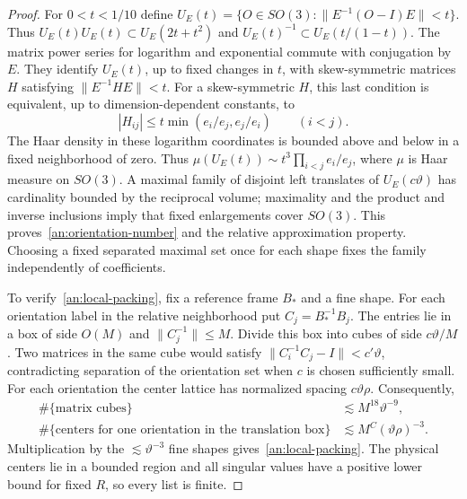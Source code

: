 \documentclass[11pt]{amsart}
\theoremstyle{definition}
\theoremstyle{remark}
\numberwithin{equation}{section}
\begin{document}
\begin{proof}
For $0<t<1/10$ define $U_E(t)=\{O\in SO(3):\|E^{-1}(O-I)E\|<t\}$. Thus $U_E(t)U_E(t)\subset U_E(2t+t^2)$ and $U_E(t)^{-1}\subset U_E(t/(1-t))$. The matrix power series for logarithm and exponential commute with conjugation by $E$. They identify $U_E(t)$, up to fixed changes in $t$, with skew-symmetric matrices $H$ satisfying $\|E^{-1}HE\|<t$. For a skew-symmetric $H$, this last condition is equivalent, up to dimension-dependent constants, to
\[
|H_{ij}|\le t\min(e_i/e_j,e_j/e_i)\qquad(i<j).
\]
The Haar density in these logarithm coordinates is bounded above and below in a fixed neighborhood of zero. Thus $\mu(U_E(t))\sim t^3\prod_{i<j}e_i/e_j$, where $\mu$ is Haar measure on $SO(3)$. A maximal family of disjoint left translates of $U_E(c\vartheta)$ has cardinality bounded by the reciprocal volume; maximality and the product and inverse inclusions imply that fixed enlargements cover $SO(3)$. This proves~\eqref{an:orientation-number} and the relative approximation property. Choosing a fixed separated maximal set once for each shape fixes the family independently of coefficients.

To verify~\eqref{an:local-packing}, fix a reference frame $B_*$ and a fine shape. For each orientation label in the relative neighborhood put $C_j=B_*^{-1}B_j$. The entries lie in a box of side $O(M)$ and $\|C_j^{-1}\|\le M$. Divide this box into cubes of side $c\vartheta/M$. Two matrices in the same cube would satisfy $\|C_i^{-1}C_j-I\|<c'\vartheta$, contradicting separation of the orientation set when $c$ is chosen sufficiently small. For each orientation the center lattice has normalized spacing $c\vartheta\rho$. Consequently,
\[
\begin{aligned}
\#\{\text{matrix cubes}\}&\lesssim M^{18}\vartheta^{-9},\\
\#\{\text{centers for one orientation in the translation box}\}&\lesssim M^C(\vartheta\rho)^{-3}.
\end{aligned}
\]
Multiplication by the $\lesssim\vartheta^{-3}$ fine shapes gives~\eqref{an:local-packing}. The physical centers lie in a bounded region and all singular values have a positive lower bound for fixed $R$, so every list is finite.
\end{proof}
\end{document}
